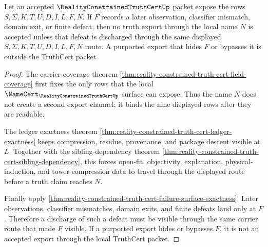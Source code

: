 \begin{theorem}
\label{thm:reality-constrained-truth-cert-export-defeat-exhaustion}
Let an accepted $\RealityConstrainedTruthCertUp$ packet expose the rows
$S,\Sigma,K,T,U,D,I,L,F,N$. If $F$ records a later observation, classifier
mismatch, domain exit, or finite defeat, then no truth export through the local
name $N$ is accepted unless that defeat is discharged through the same displayed
$S,\Sigma,K,T,U,D,I,L,F,N$ route. A purported export that hides $F$ or bypasses
it is outside the TruthCert packet.
\end{theorem}
\begin{proof}
The carrier coverage theorem
\autoref{thm:reality-constrained-truth-cert-field-coverage} first fixes the
only rows that the local $\NameCert_{\RealityConstrainedTruthCertUp}$ surface
can expose. Thus the name $N$ does not create a second export channel; it binds
the nine displayed rows after they are readable.

The ledger exactness theorem
\autoref{thm:reality-constrained-truth-cert-ledger-exactness} keeps
compression, residue, provenance, and package descent visible at $L$. Together
with the sibling-dependency theorem
\autoref{thm:reality-constrained-truth-cert-sibling-dependency}, this forces
open-fit, objectivity, explanation, physical-induction, and tower-compression
data to travel through the displayed route before a truth claim reaches $N$.

Finally apply
\autoref{thm:reality-constrained-truth-cert-failure-surface-exactness}. Later
observations, classifier mismatches, domain exits, and finite defeats land
only at $F$. Therefore a discharge of such a defeat must be visible through the
same carrier route that made $F$ visible. If a purported export hides or
bypasses $F$, it is not an accepted export through the local TruthCert packet.
\end{proof}

